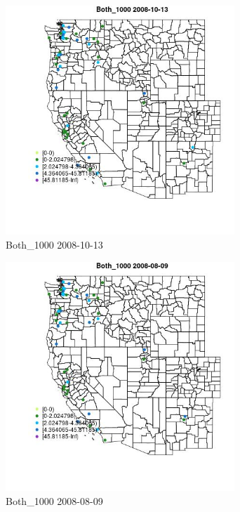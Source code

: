 \begin{figure} 
\centering  
\includegraphics[width=0.77\textwidth]{Code_Outputs/Report_ML_input_PM25_Step4_part_e_de_duplicated_aves_MapObsBoth_10002008-10-13.jpg} 
\caption{\label{fig:Report_ML_input_PM25_Step4_part_e_de_duplicated_avesMapObsBoth_10002008-10-13}Both_1000 2008-10-13} 
\end{figure} 
 

\begin{figure} 
\centering  
\includegraphics[width=0.77\textwidth]{Code_Outputs/Report_ML_input_PM25_Step4_part_e_de_duplicated_aves_MapObsBoth_10002008-08-09.jpg} 
\caption{\label{fig:Report_ML_input_PM25_Step4_part_e_de_duplicated_avesMapObsBoth_10002008-08-09}Both_1000 2008-08-09} 
\end{figure} 
 


